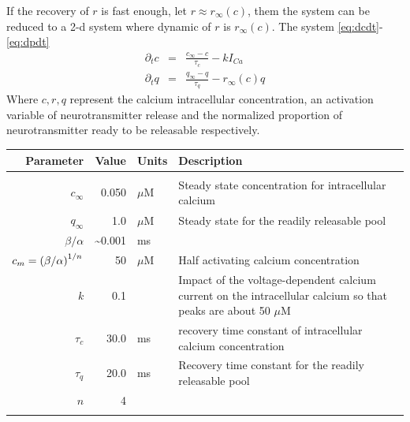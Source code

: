 If the recovery of $r$ is fast enough, let $r \approx r_{\infty}(c)$, them the system can be reduced to a 2-d system where dynamic of $r$ is $r_{\infty}(c)$.
The system \eqref{eq:dcdt}-\eqref{eq:dpdt}
\begin{eqnarray}
\partial_t c &=& \frac{c_{\infty}-c}{\tau_c} - k I_{Ca}
\\
\partial_t q &=&  \frac{q_{\infty}-q}{\tau_q} -  r_{\infty}(c) q
\end{eqnarray}
Where $c,r,q$ represent the calcium intracellular concentration, an activation variable of neurotransmitter release and the normalized proportion of neurotransmitter ready to be releasable respectively.
\begin{table}
\begin{tabular}{r r l p{}}
Parameter & Value & Units & Description \\
\hline &&&\\
$c_{\infty}$ & 0.050 & $\mu$M & Steady state concentration for intracellular calcium \citep{regehr1995calcium}\\
$q_{\infty}$ & 1.0 & $\mu$M & Steady state for the readily releasable pool\\
$\beta/\alpha$ & \sim 0.001 & ms & \citep{destexhe1994synthesis}
\\
$c_{m}=\left(\beta/\alpha\right)^{1/n}$ & 50 & $\mu$M & Half activating calcium concentration \\
$ k $ & 0.1  &  & Impact of the voltage-dependent calcium current on the intracellular calcium so that peaks are about 50 $\mu$M \citep{regehr1995calcium} \\
$\tau_c$ & 30.0 & ms & recovery time constant of intracellular calcium concentration\\
$\tau_q$ & 20.0 & ms & Recovery time constant for the readily releasable pool\\
$n$ & 4 & & \citep{}  \\
\hline &&&\\
\end{tabular}
\end{table}


